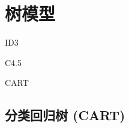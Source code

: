 \chapter{树模型}

\begin{introduction}
    \item ID3
    \item C4.5
    \item CART
\end{introduction}

\section{分类回归树 (CART)}